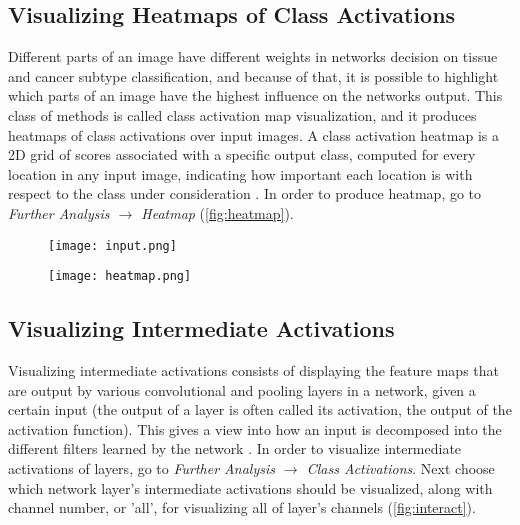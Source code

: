 \subsection{Visualizing Heatmaps of Class Activations}

Different parts of an image have different weights in networks decision on tissue and cancer subtype classification, and because of that, it is possible to highlight which parts of an image have the highest influence on the networks output. This class of methods is called class activation map visualization, and it produces heatmaps of class activations over input images. A class activation heatmap is a 2D grid of scores associated with a specific output class, computed for every location in any input image, indicating how important each location is with respect to the class under consideration \cite{chollet2018deep}. In order to produce heatmap, go to \emph{Further Analysis $\rightarrow$ Heatmap} (\textcolor{red}{\autoref{fig:heatmap}}).

\begin{figure}[h]
	\centering
	\begin{minipage}{.5\textwidth}
		\vspace*{0.5cm}
		\centering
		\texttt{[image: input.png]}
		\label{fig:input}
	\end{minipage}%
	\begin{minipage}{.5\textwidth}
		\centering
		\texttt{[image: heatmap.png]}
		\label{fig:heatmap}
	\end{minipage}
\end{figure}

\subsection{Visualizing Intermediate Activations}

Visualizing intermediate activations consists of displaying the feature maps that are output by various convolutional and pooling layers in a network, given a certain input (the output of a layer is often called its activation, the output of the activation function). This gives a view into how an input is decomposed into the different filters learned by the network \cite{chollet2018deep}. In order to visualize intermediate activations of layers, go to \emph{Further Analysis $\rightarrow$ Class Activations}. Next choose which network layer's intermediate activations should be visualized, along with channel number, or 'all', for visualizing all of layer's channels  (\textcolor{red}{\autoref{fig:interact}}).

